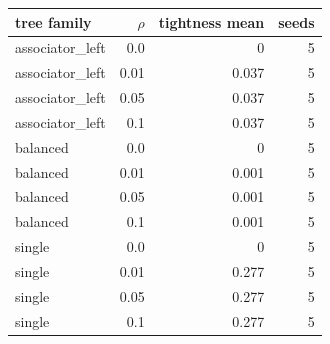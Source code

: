 \begin{tabular}{lrrr}
\toprule
tree family & $\rho$ & tightness mean & seeds \\
\midrule
associator\_left & 0.0 & 0 & 5 \\
associator\_left & 0.01 & 0.037 & 5 \\
associator\_left & 0.05 & 0.037 & 5 \\
associator\_left & 0.1 & 0.037 & 5 \\
balanced & 0.0 & 0 & 5 \\
balanced & 0.01 & 0.001 & 5 \\
balanced & 0.05 & 0.001 & 5 \\
balanced & 0.1 & 0.001 & 5 \\
single & 0.0 & 0 & 5 \\
single & 0.01 & 0.277 & 5 \\
single & 0.05 & 0.277 & 5 \\
single & 0.1 & 0.277 & 5 \\
\bottomrule
\end{tabular}
